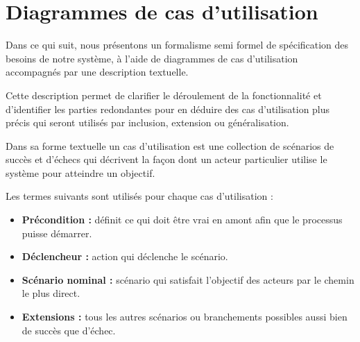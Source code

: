 \section{	Diagrammes de cas d'utilisation}
\hspace{4mm}Dans ce qui suit, nous présentons un formalisme semi formel de spécification des besoins de notre système, à l’aide de diagrammes de cas d’utilisation accompagnés par une description textuelle.
\par Cette description permet de clarifier le déroulement de la fonctionnalité et d’identifier les parties redondantes pour en déduire des cas d’utilisation plus précis qui seront utilisés par inclusion, extension ou généralisation.
\par Dans sa forme textuelle un cas d’utilisation est une collection de scénarios de succès et d’échecs qui décrivent la façon dont un acteur particulier utilise le système pour atteindre un objectif.
\par Les termes suivants sont utilisés pour chaque cas d’utilisation :
\begin{itemize}
    \item \textbf{ Précondition : }définit ce qui doit être vrai en amont afin que le processus puisse démarrer.
    \item \textbf{	Déclencheur : }action qui déclenche le scénario.
    \item \textbf{ Scénario nominal : }scénario qui satisfait l’objectif des acteurs par le chemin le plus direct.
    \item \textbf{	Extensions : }tous les autres scénarios ou branchements possibles aussi bien de succès que d’échec.
\end{itemize}
